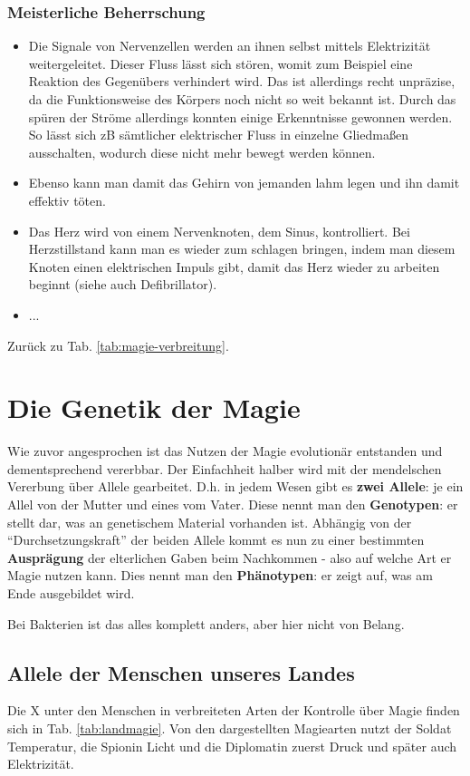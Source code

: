 \subsubsection{Meisterliche Beherrschung} 
\begin{itemize}
	\item Die Signale von Nervenzellen werden an ihnen selbst mittels Elektrizität weitergeleitet. Dieser Fluss lässt sich stören, womit zum Beispiel eine Reaktion des Gegenübers verhindert wird. Das ist allerdings recht unpräzise, da die Funktionsweise des Körpers noch nicht so weit bekannt ist. Durch das spüren der Ströme allerdings konnten einige Erkenntnisse gewonnen werden. So lässt sich zB sämtlicher elektrischer Fluss in einzelne Gliedmaßen ausschalten, wodurch diese nicht mehr bewegt werden können.
	\item Ebenso kann man damit das Gehirn von jemanden lahm legen und ihn damit effektiv töten.
	\item Das Herz wird von einem Nervenknoten, dem Sinus, kontrolliert. Bei Herzstillstand kann man es wieder zum schlagen bringen, indem man diesem Knoten einen elektrischen Impuls gibt, damit das Herz wieder zu arbeiten beginnt (siehe auch Defibrillator).
	\item ...
\end{itemize}
Zurück zu Tab. \ref{tab:magie-verbreitung}.



\section{Die Genetik der Magie}
Wie zuvor angesprochen ist das Nutzen der Magie evolutionär entstanden und dementsprechend vererbbar.
Der Einfachheit halber wird mit der mendelschen Vererbung über Allele gearbeitet.
D.h. in jedem Wesen gibt es \textbf{zwei Allele}: je ein Allel von der Mutter und eines vom Vater.
Diese nennt man den \textbf{Genotypen}: er stellt dar, was an genetischem Material vorhanden ist.
Abhängig von der "`Durchsetzungskraft"' der beiden Allele kommt es nun zu einer bestimmten \textbf{Ausprägung} der elterlichen Gaben beim Nachkommen - also auf welche Art er Magie nutzen kann.
Dies nennt man den \textbf{Phänotypen}: er zeigt auf, was am Ende ausgebildet wird.

Bei Bakterien ist das alles komplett anders, aber hier nicht von Belang.


\subsection{Allele der Menschen unseres Landes} %
Die X %
unter den Menschen in  verbreiteten Arten der Kontrolle über Magie finden sich in Tab. \ref{tab:landmagie}.
Von den dargestellten Magiearten nutzt der Soldat Temperatur, %
die Spionin Licht %
und die Diplomatin zuerst Druck und später auch Elektrizität. %


